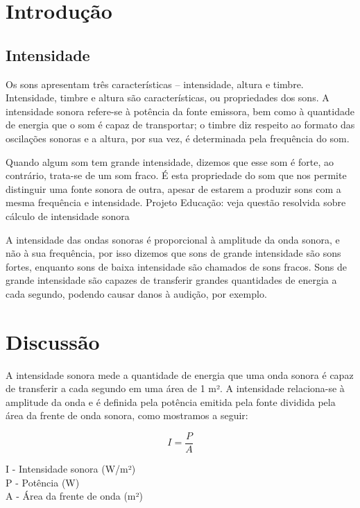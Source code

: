 \documentclass[
	article,		
	11pt,			
	oneside,		
	a4paper,			
	english,			
	brazil			
]{abntex2}
\begin{document}
\textual

\section{Introdução}

\subsection{Intensidade}
Os sons apresentam três características – intensidade, altura e timbre. Intensidade, timbre e altura são características, ou propriedades dos sons. A intensidade sonora refere-se à potência da fonte emissora, bem como à quantidade de energia que o som é capaz de transportar; o timbre diz respeito ao formato das oscilações sonoras e a altura, por sua vez, é determinada pela frequência do som.

Quando algum som tem grande intensidade, dizemos que esse som é forte, ao contrário, trata-se de um som fraco. É esta propriedade do som que nos permite distinguir uma fonte sonora de outra, apesar de estarem a produzir sons com a mesma frequência e intensidade. Projeto Educação: veja questão resolvida sobre cálculo de intensidade sonora

A intensidade das ondas sonoras é proporcional à amplitude da onda sonora, e não à sua frequência, por isso dizemos que sons de grande intensidade são sons fortes, enquanto sons de baixa intensidade são chamados de sons fracos. Sons de grande intensidade são capazes de transferir grandes quantidades de energia a cada segundo, podendo causar danos à audição, por exemplo.\cite{HELERBROCKIntensidadeSomBrasilEscola}

\section{Discussão}

A intensidade sonora mede a quantidade de energia que uma onda sonora é capaz de transferir a cada segundo em uma área de 1 m². A intensidade relaciona-se à amplitude da onda e é definida pela potência emitida pela fonte dividida pela área da frente de onda sonora, como mostramos a seguir:

\begin{equation}
    I=\frac{P}{A}
\end{equation}

\begin{center}
I - Intensidade sonora (W/m²)\\
P - Potência (W)\\
A - Área da frente de onda (m²)
\end{center}
\end{document}
